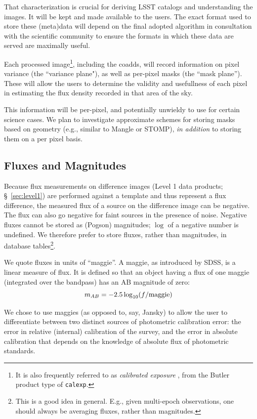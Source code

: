 \documentclass[12pt]{article}
\newcommand{\B}[1]{{\color{blue} #1}}
\newcommand{\req}[1]{\marginpar{\tiny #1}}
\newcommand{\dmreq}[1]{\req{DMS-REQ-#1}}
\begin{document}
That characterization is crucial for deriving LSST catalogs and understanding the images. It will be kept and made available to the users. The exact format used to store these (meta)data will depend on the final adopted algorithm in consultation with the scientific community to ensure the formats in which these data are served are maximally useful.

\dmreq{0072}Each processed image\footnote{It is also frequently referred to as {\em calibrated exposure}\B{, from the Butler product type of \texttt{calexp}}.}, including the coadds, will record information on pixel variance (the ``variance plane"), as well as per-pixel masks (the ``mask plane''). These will allow the users to determine the validity and usefullness of each pixel in estimating the flux density recorded in that area of the sky.

This information will be per-pixel, and potentially unwieldy to use for certain science cases. We plan to investigate approximate schemes for storing masks based on geometry (e.g., similar to Mangle or STOMP), {\em in addition} to storing them on a per pixel basis.

\subsection{Fluxes and Magnitudes}
\label{sec:fluxes}

Because flux measurements on difference images (Level 1 data products; \S~\ref{sec:level1}) are performed against a template
and thus represent a flux difference, the measured flux of a source on the difference image can be negative. The flux can also go negative for faint sources in the presence of noise. Negative fluxes cannot be stored as (Pogson) magnitudes; $\log$ of a negative number is undefined. We therefore prefer to store fluxes, rather than magnitudes, in database tables\footnote{This is a good idea in general. E.g., given multi-epoch observations, one should always be averaging fluxes, rather than magnitudes.}.

We quote fluxes in units of ``maggie''. A maggie, as introduced by SDSS, is a linear measure of flux. It is defined so that an object having a flux of one maggie (integrated over the bandpass) has an AB magnitude of zero:
\begin{equation}
    m_{AB} = -2.5 \log_{10}(f/{\rm maggie})
\end{equation}

We chose to use maggies (as opposed to, say, Jansky) to allow the user to differentiate between two distinct sources of photometric calibration error: the error in relative (internal) calibration of the survey, and the error in absolute calibration that depends on the knowledge of absolute flux of photometric standards.
\end{document}
